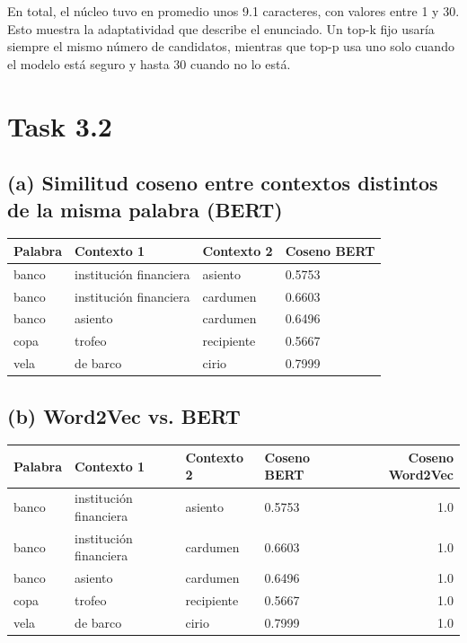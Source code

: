 \documentclass[11pt]{article}
\begin{document}
En total, el núcleo tuvo en promedio unos 9.1 caracteres, con valores entre 1 y 30. Esto muestra la adaptatividad que describe el enunciado. Un top-k fijo usaría siempre el mismo número de candidatos, mientras que top-p usa uno solo cuando el modelo está seguro y hasta 30 cuando no lo está.

\section*{Task 3.2}

\subsection*{(a) Similitud coseno entre contextos distintos de la misma palabra (BERT)}
\begin{table}[H]
\centering
\begin{tabular}{llll}
\toprule
Palabra & Contexto 1 & Contexto 2 & Coseno BERT \\
\midrule
banco & institución financiera & asiento & 0.5753 \\
banco & institución financiera & cardumen & 0.6603 \\
banco & asiento & cardumen & 0.6496 \\
copa & trofeo & recipiente & 0.5667 \\
vela & de barco & cirio & 0.7999 \\
\bottomrule
\end{tabular}
\end{table}

\subsection*{(b) Word2Vec vs. BERT}
\begin{table}[H]
\centering
\begin{tabular}{llllr}
\toprule
Palabra & Contexto 1 & Contexto 2 & Coseno BERT & Coseno Word2Vec \\
\midrule
banco & institución financiera & asiento & 0.5753 & 1.0 \\
banco & institución financiera & cardumen & 0.6603 & 1.0 \\
banco & asiento & cardumen & 0.6496 & 1.0 \\
copa & trofeo & recipiente & 0.5667 & 1.0 \\
vela & de barco & cirio & 0.7999 & 1.0 \\
\bottomrule
\end{tabular}
\end{table}
\end{document}
